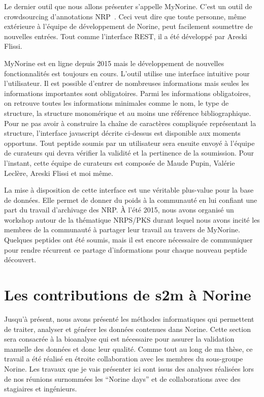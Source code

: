 Le dernier outil que nous allons présenter s'appelle MyNorine.
C'est un outil de crowdsourcing d'annotations NRP~\cite{flissi_norine_2016}.
Ceci veut dire que toute personne, même extérieure à l'équipe de développement de Norine, peut facilement soumettre de nouvelles entrées.
Tout comme l'interface REST, il a été développé par Areski Flissi.

MyNorine est en ligne depuis 2015 mais le développement de nouvelles fonctionnalités est toujours en cours.
L'outil utilise une interface intuitive pour l'utilisateur.
Il est possible d'entrer de nombreuses informations mais seules les informations importantes sont obligatoires.
Parmi les informations obligatoires, on retrouve toutes les informations minimales comme le nom, le type de structure, la structure monomérique et au moins une référence bibliographique.
Pour ne pas avoir à construire la chaîne de caractères compliquée représentant la structure, l'interface javascript décrite ci-dessus est disponible aux moments opportuns.
Tout peptide soumis par un utilisateur sera ensuite envoyé à l'équipe de curateurs qui devra vérifier la validité et la pertinence de la soumission.
Pour l'instant, cette équipe de curateurs est composée de Maude Pupin, Valérie Leclère, Areski Flissi et moi même.

La mise à disposition de cette interface est une véritable plus-value pour la base de données.
Elle permet de donner du poids à la communauté en lui confiant une part du travail d'archivage des NRP.
À l'été 2015, nous avons organisé un workshop autour de la thématique NRPS/PKS durant lequel nous avons incité les membres de la communauté à partager leur travail au travers de MyNorine.
Quelques peptides ont été soumis, mais il est encore nécessaire de communiquer pour rendre récurrent ce partage d'informations pour chaque nouveau peptide découvert.









\section{Les contributions de s2m à Norine}
\label{cont_nor}

Jusqu'à présent, nous avons présenté les méthodes informatiques qui permettent de traiter, analyser et générer les données contenues dans Norine.
Cette section sera consacrée à la bioanalyse qui est nécessaire pour assurer la validation manuelle  des données et donc leur qualité.
Comme tout au long de ma thèse, ce travail a été réalisé en étroite collaboration avec les membres du sous-groupe Norine.
Les travaux que je vais présenter ici sont issus des analyses réalisées lors de nos réunions surnommées les ``Norine days'' et de collaborations avec des stagiaires et ingénieurs.

